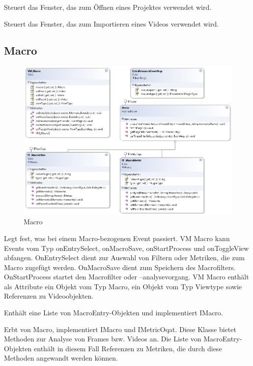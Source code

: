 Steuert das Fenster, das zum Öffnen eines Projektes verwendet wird.


Steuert das Fenster, das zum Importieren eines Videos verwendet wird.

\pagebreak
\subsection{Macro}
\begin{figure}[H]
\noindent\includegraphics[width=\linewidth,height=\textheight,
keepaspectratio]{bilder/Klassendiagramm/Macro.png}
\caption{Macro}
\end{figure}


Legt fest, was bei einem Macro-bezogenen Event passiert. VM Macro kann Events vom Typ onEntrySelect, onMacroSave, onStartProcess und onToggleView abfangen. OnEntrySelect dient zur Auswahl von Filtern oder Metriken, die zum Macro zugefügt werden. OnMacroSave dient zum Speichern des Macrofilters. OnStartProcess startet den Macrofilter oder –analysevorgang. VM Macro enthält als Attribute ein Objekt vom Typ Macro, ein Objekt vom Typ Viewtype sowie Referenzen zu Videoobjekten.


Enthält eine Liste von MacroEntry-Objekten und implementiert IMacro.


Erbt von Macro, implementiert IMacro und IMetricOqat. Diese Klasse bietet Methoden zur Analyse von Frames bzw. Videos an. Die Liste von MacroEntry-Objekten enthält in diesem Fall Referenzen zu Metriken, die durch diese Methoden angewandt werden können.


